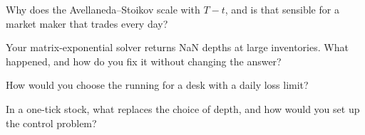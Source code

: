 \begin{interviewq}\label{iq:hf:inventory-models:3}
Why does the Avellaneda--Stoikov  scale with $T-t$, and is that sensible for a market maker that trades every day?
\end{interviewq}

\begin{interviewq}\label{iq:hf:inventory-models:4}
Your matrix-exponential solver returns NaN depths at large inventories. What happened, and how do you fix it without changing the answer?
\end{interviewq}

\begin{interviewq}\label{iq:hf:inventory-models:5}
How would you choose the running  for a desk with a daily loss limit?
\end{interviewq}

\begin{interviewq}\label{iq:hf:inventory-models:6}
In a one-tick stock, what replaces the choice of depth, and how would you set up the control problem?
\end{interviewq}
